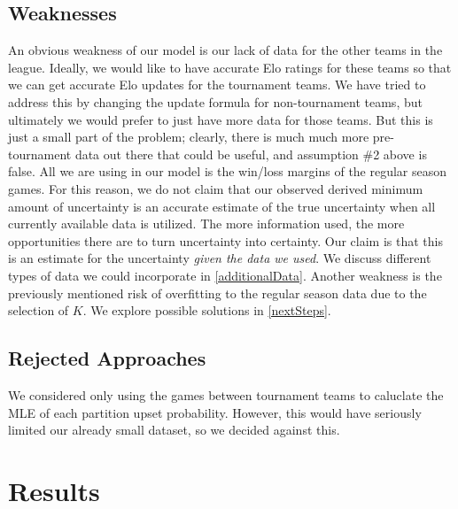 \documentclass{article}
\begin{document}
\subsection{Weaknesses}
An obvious weakness of our model is our lack of data for the other teams in the league. Ideally, we would like to have accurate Elo ratings for these teams so that we can get accurate Elo updates for the tournament teams. We have tried to address this by changing the update formula for non-tournament teams, but ultimately we would prefer to just have more data for those teams. But this is just a small part of the problem; clearly, there is much much more pre-tournament data out there that could be useful, and assumption \#2 above is false. All we are using in our model is the win/loss margins of the regular season games. For this reason, we do not claim that our observed derived minimum amount of uncertainty is an accurate estimate of the true uncertainty when all currently available data is utilized. The more information used, the more opportunities there are to turn uncertainty into certainty. Our claim is that this is an estimate for the uncertainty \textit{given the data we used}. We discuss different types of data we could incorporate in \autoref{additionalData}. Another weakness is the previously mentioned risk of overfitting to the regular season data due to the selection of $K$. We explore possible solutions in \autoref{nextSteps}.

\subsection{Rejected Approaches}
We considered only using the games between tournament teams to caluclate the MLE of each partition upset probability. However, this would have seriously limited our already small dataset, so we decided against this. 


\section{Results}
\end{document}
